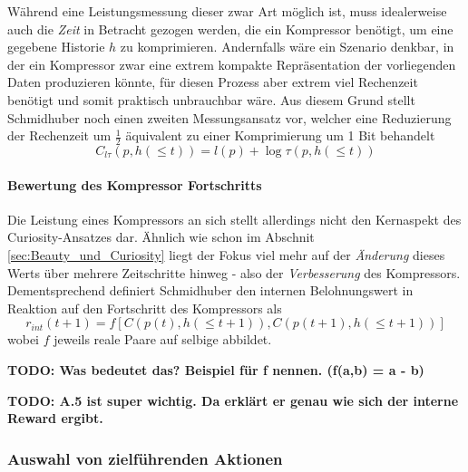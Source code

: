 Während eine Leistungsmessung dieser zwar Art möglich ist, muss idealerweise auch die \emph{Zeit} in Betracht gezogen werden, die ein Kompressor benötigt, um eine gegebene Historie \(h\) zu komprimieren. Andernfalls wäre ein Szenario denkbar, in der ein Kompressor zwar eine extrem kompakte Repräsentation der vorliegenden Daten produzieren könnte, für diesen Prozess aber extrem viel Rechenzeit benötigt und somit praktisch unbrauchbar wäre.
Aus diesem Grund stellt Schmidhuber noch einen zweiten Messungsansatz vor, welcher eine Reduzierung der Rechenzeit um \(\frac{1}{2}\) äquivalent zu einer Komprimierung um 1 Bit behandelt \cite[p.~19]{curiosity_schmidhuber}
\begin{equation}
  C_{l\tau}(p,h(\leq t)) = l(p) + \log \tau(p, h(\leq t))
\end{equation}

\paragraph{Bewertung des Kompressor Fortschritts}
Die Leistung eines Kompressors an sich stellt allerdings nicht den Kernaspekt des Curiosity-Ansatzes dar. Ähnlich wie schon im Abschnit \ref{sec:Beauty_und_Curiosity} liegt der Fokus viel mehr auf der \emph{Änderung} dieses Werts über mehrere Zeitschritte hinweg - also der \emph{Verbesserung} des Kompressors.
Dementsprechend definiert Schmidhuber den internen Belohnungswert in Reaktion auf den Fortschritt des Kompressors als 
\begin{equation}
  r_{int}(t+1) = f\left[C(p(t),h(\leq t+1)), C(p(t+1),h(\leq t+1))\right]  
\end{equation}
wobei \(f\) jeweils reale Paare auf selbige abbildet. \cite[p.~19]{curiosity_schmidhuber}

\textbf{TODO: Was bedeutet das? Beispiel für f nennen. (f(a,b) = a - b)}

\textbf{TODO: A.5 ist super wichtig. Da erklärt er genau wie sich der interne Reward ergibt.}
\subsubsection{Auswahl von zielführenden Aktionen}

